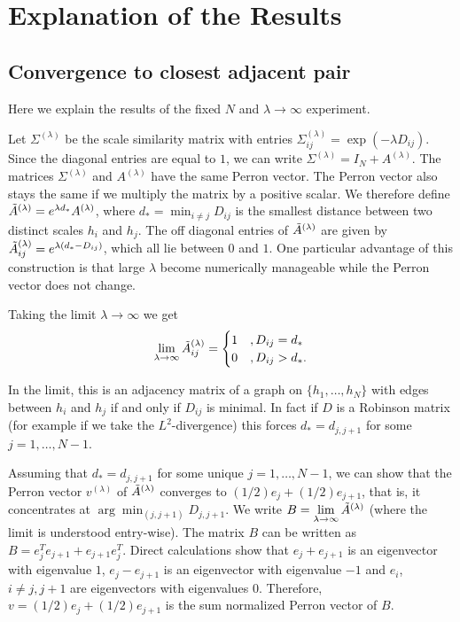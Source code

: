 \section{Explanation of the Results}\label{sec:res_2}

\subsection{Convergence to closest adjacent pair}

Here we explain the results of the fixed $N$ and $\lambda\to\infty$ experiment.

Let $\Sigma^{(\lambda)}$ be the scale similarity matrix with entries $\Sigma^{(\lambda)}_{ij}=\exp{(-\lambda D_{ij})}$. Since the diagonal entries are equal to $1$, we can write $\Sigma^{(\lambda)}=I_N+A^{(\lambda)}$. The matrices $\Sigma^{(\lambda)}$ and $A^{(\lambda)}$ have the same Perron vector. The Perron vector also stays the same if we multiply the matrix by a positive scalar. We therefore define $\Tilde{A}^{(\lambda)}=e^{\lambda d_{\ast}}A^{(\lambda)}$, where $d_{\ast}=\min_{i\ne j}D_{ij}$ is the smallest distance between two distinct scales $h_i$ and $h_j$. The off diagonal entries of $\Tilde{A}^{(\lambda)}$ are given by $\Tilde{A}^{(\lambda)}_{ij}=e^{\lambda(d_{\ast}-D_{ij})}$, which all lie between $0$ and $1$. One particular advantage of this construction is that large $\lambda$ become numerically manageable while the Perron vector does not change.


Taking the limit $\lambda\to\infty$ we get
\begin{align*}
    \lim\limits_{\lambda\to\infty}\Tilde{A}_{ij}^{(\lambda)}=\begin{cases}
        1 & ,D_{ij}=d_{\ast}\\
        0 & ,D_{ij}>d_{\ast}.
    \end{cases}
\end{align*}

In the limit, this is an adjacency matrix of a graph on $\{h_1,\dots,h_N\}$ with edges between $h_i$ and $h_j$ if and only if $D_{ij}$ is minimal. In fact if $D$ is a Robinson matrix (for example if we take the $L^2$-divergence) this forces $d_{\ast}=d_{j,j+1}$ for some $j=1,\dots,N-1$.

Assuming that $d_{\ast}=d_{j,j+1}$ for some unique $j=1,\dots,N-1$, we can show that the Perron vector $v^{(\lambda)}$ of $\Tilde{A}^{(\lambda)}$ converges to $(1/2)e_j+(1/2)e_{j+1}$, that is, it concentrates at $\arg\min_{(j,j+1)}D_{j,j+1}$. We write $B=\lim\limits_{\lambda\to\infty}\Tilde{A}^{(\lambda)}$ (where the limit is understood entry-wise). The matrix $B$ can be written as $B=e_j^{T}e_{j+1}+e_{j+1}e_j^{T}$. Direct calculations show that $e_{j}+e_{j+1}$ is an eigenvector with eigenvalue $1$, $e_j-e_{j+1}$ is an eigenvector with eigenvalue $-1$ and $e_i$, $i\ne j,j+1$ are eigenvectors with eigenvalues $0$. Therefore, $v=(1/2)e_j+(1/2)e_{j+1}$ is the sum normalized Perron vector of $B$.

